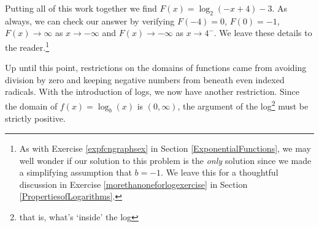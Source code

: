 \begin{ex}
\begin{enumerate}
\smallskip

Putting all of this work together we find $F(x) = \log_{2}(-x+4)-3$.  As always, we can check our answer by verifying $F(-4) = 0$, $F(0) = -1$, $F(x) \rightarrow \infty$ as $x \rightarrow -\infty$ and $F(x) \rightarrow -\infty$ as $x \rightarrow 4^{-}$.  We leave these details to the reader.\footnote{As with Exercise \ref{expfcngraphsex} in Section \ref{ExponentialFunctions},  we may well wonder if our solution to this problem  is the  \textit{only} solution since we made a simplifying assumption that $b=-1$.  We leave this for a thoughtful discussion in Exercise \ref{morethanoneforlogexercise} in Section \ref{PropertiesofLogarithms}.}

\end{enumerate}

\end{ex}

Up until this point, restrictions on the domains of functions came from avoiding division by zero and keeping negative numbers from beneath even indexed radicals.  With the introduction of logs, we now have another restriction.  Since the domain of $f(x) = \log_{b}(x)$ is $(0, \infty)$, the argument of the log\footnote{ that is, what's `inside' the log}  must be strictly positive.  

